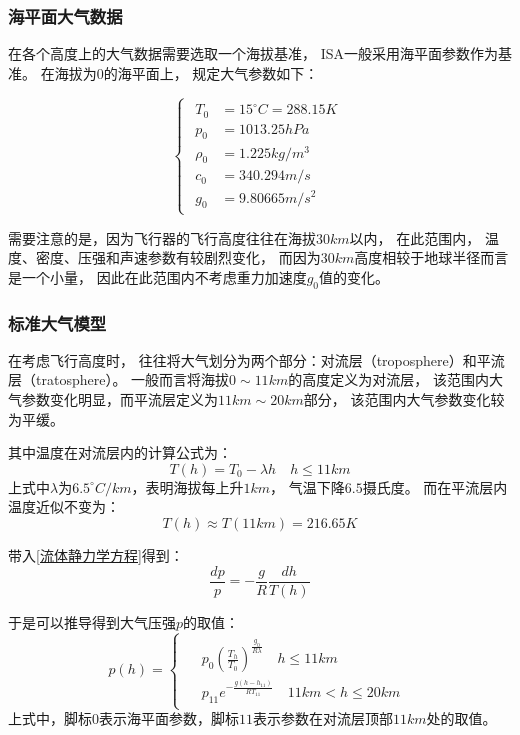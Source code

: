 \subsubsection{海平面大气数据}

在各个高度上的大气数据需要选取一个海拔基准，
ISA一般采用海平面参数作为基准。
在海拔为$0$的海平面上，
规定大气参数如下：

\begin{equation}
    \begin{cases}
        \begin{aligned}
            T_0 & = 15^{\circ}C = 288.15K\\
            p_0 & = 1013.25hPa\\
            \rho_0 & = 1.225kg/m^3\\
            c_0 & = 340.294 m/s\\
            g_0 & = 9.80665 m/s^2
        \end{aligned}
    \end{cases}
\end{equation}

需要注意的是，因为飞行器的飞行高度往往在海拔$30km$以内，
在此范围内，
温度、密度、压强和声速参数有较剧烈变化，
而因为$30km$高度相较于地球半径而言是一个小量，
因此在此范围内不考虑重力加速度$g_0$值的变化。

\subsubsection{标准大气模型}

在考虑飞行高度时，
往往将大气划分为两个部分：对流层（troposphere）和平流层（tratosphere）。
一般而言将海拔$0\sim 11km$的高度定义为对流层，
该范围内大气参数变化明显，而平流层定义为$11km\sim 20km$部分，
该范围内大气参数变化较为平缓。

其中温度在对流层内的计算公式为：
\begin{equation}
    T(h) = T_0 - \lambda h\quad h\leq 11km
\end{equation}
上式中$\lambda$为$6.5^{\circ}C/km$，表明海拔每上升$1km$，
气温下降$6.5$摄氏度。
而在平流层内温度近似不变为：
\begin{equation}
    T(h) \approx T(11km) = 216.65K
\end{equation}

带入\ref{流体静力学方程}得到：
\begin{equation}
    \frac{dp}{p} = -\frac{g}{R}\frac{dh}{T(h)}
\end{equation}

于是可以推导得到大气压强$p$的取值：
\begin{equation}
    p(h)=
    \begin{cases}
        \begin{aligned}
            &p_0 \left(  \frac{T_h}{T_0}\right)^{\frac{g_0}{R\lambda}} \quad h\leq 11km\\
            &p_{11} e^{-\frac{g(h - h_{11})}{RT_{11}}} \quad 11km<h \leq 20km
        \end{aligned}
    \end{cases}
\end{equation}
上式中，脚标$0$表示海平面参数，脚标$11$表示参数在对流层顶部$11km$处的取值。

